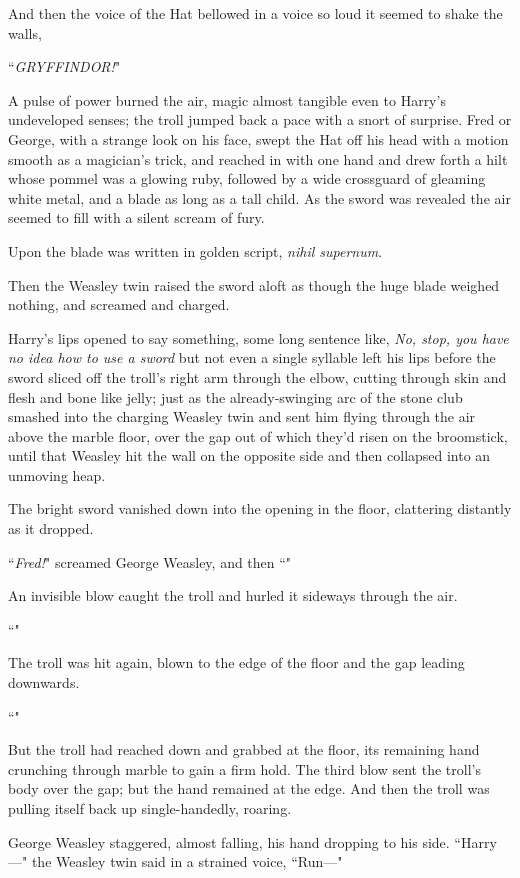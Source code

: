 And then the voice of the Hat bellowed in a voice so loud it seemed to shake the walls,

``\emph{GRYFFINDOR!}"

A pulse of power burned the air, magic almost tangible even to Harry's undeveloped senses; the troll jumped back a pace with a snort of surprise. Fred or George, with a strange look on his face, swept the Hat off his head with a motion smooth as a magician's trick, and reached in with one hand and drew forth a hilt whose pommel was a glowing ruby, followed by a wide crossguard of gleaming white metal, and a blade as long as a tall child. As the sword was revealed the air seemed to fill with a silent scream of fury.

Upon the blade was written in golden script, \emph{nihil supernum}.

Then the Weasley twin raised the sword aloft as though the huge blade weighed nothing, and screamed and charged.

Harry's lips opened to say something, some long sentence like, \emph{No, stop, you have no idea how to use a sword} but not even a single syllable left his lips before the sword sliced off the troll's right arm through the elbow, cutting through skin and flesh and bone like jelly; just as the already-swinging arc of the stone club smashed into the charging Weasley twin and sent him flying through the air above the marble floor, over the gap out of which they'd risen on the broomstick, until that Weasley hit the wall on the opposite side and then collapsed into an unmoving heap.

The bright sword vanished down into the opening in the floor, clattering distantly as it dropped.

``\emph{Fred!}" screamed George Weasley, and then ``"

An invisible blow caught the troll and hurled it sideways through the air.

``"

The troll was hit again, blown to the edge of the floor and the gap leading downwards.

``"

But the troll had reached down and grabbed at the floor, its remaining hand crunching through marble to gain a firm hold. The third blow sent the troll's body over the gap; but the hand remained at the edge. And then the troll was pulling itself back up single-handedly, roaring.

George Weasley staggered, almost falling, his hand dropping to his side. ``Harry—" the Weasley twin said in a strained voice, ``Run—"

